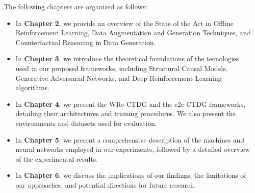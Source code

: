 The following chapters are organized as follows:
\begin{itemize}
    \item In \textbf{Chapter 2}, we provide an overview of the State of the Art
    in Offline Reinforcement Learning, Data Augmentation and Generation Techniques,
    and Counterfactual Reasoning in Data Generation.
    \item In \textbf{Chapter 3}, we introduce the theoretical foundations
    of the tecnologies used in our proposed frameworks,
    including Structural Causal Models,
    Generative Adversarial Networks,
    and Deep Reinforcement Learning algorithms.
    \item In \textbf{Chapter 4}, we present the WRe-CTDG
    and the e2e-CTDG frameworks,
    detailing their architectures and training procedures.
    We also present the environments and datasets used for evaluation.
    \item In \textbf{Chapter 5}, we present a comprehensive description
    of the machines and neural networks employed in our experiments,
    followed by a detailed overview of the experimental results.
    \item In \textbf{Chapter 6}, we discuss the implications of our findings,
    the limitations of our approaches,
    and potential directions for future research.
\end{itemize}